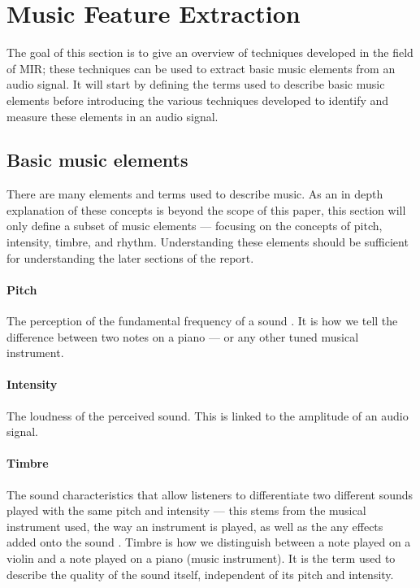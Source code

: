 \documentclass[../initial_thesis.tex]{subfiles}
\begin{document}
\section{Music Feature Extraction}\label{sec:mir}
The goal of this section is to give an overview of techniques developed in the field of MIR; these techniques can be used to extract basic music elements from an audio signal. It will start by defining the terms used to describe basic music elements before introducing the various techniques developed to identify and measure these elements in an audio signal.

\subsection{Basic music elements}
There are many elements and terms used to describe music. As an in depth explanation of these concepts is beyond the scope of this paper, this section will only define a subset of music elements --- focusing on the concepts of pitch, intensity, timbre, and rhythm. Understanding these elements should be sufficient for understanding the later sections of the report.

\paragraph{Pitch} The perception of the fundamental frequency of a sound \cite{Orio2006}. It is how we tell the difference between two notes on a piano --- or any other tuned musical instrument.

\paragraph{Intensity} The loudness of the perceived sound. This is linked to the amplitude of an audio signal.

\paragraph{Timbre} The sound characteristics that allow listeners to differentiate two different sounds played with the same pitch and intensity --- this stems from the musical instrument used, the way an instrument is played, as well as the any effects added onto the sound \cite{Orio2006}. Timbre is how we distinguish between a note played on a violin and a note played on a piano (music instrument). It is the term used to describe the quality of the sound itself, independent of its pitch and intensity.
\end{document}
